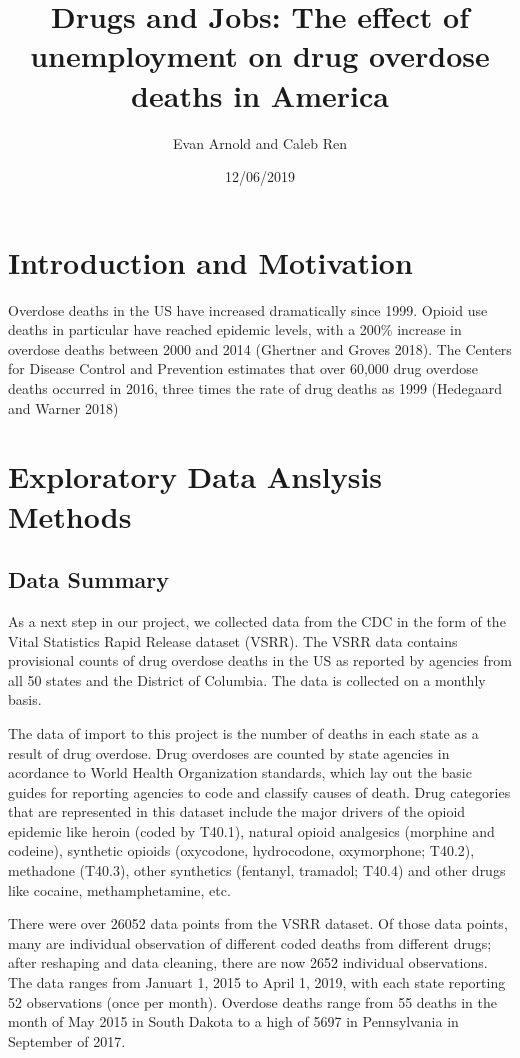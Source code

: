 \documentclass[]{article}
\title{Drugs and Jobs: The effect of unemployment on drug overdose deaths in
America}
\author{Evan Arnold and Caleb Ren}
\date{12/06/2019}
\begin{document}
\maketitle

\section{Introduction and Motivation}

Overdose deaths in the US have increased dramatically since 1999. Opioid
use deaths in particular have reached epidemic levels, with a 200\%
increase in overdose deaths between 2000 and 2014 (Ghertner and Groves
2018). The Centers for Disease Control and Prevention estimates that
over 60,000 drug overdose deaths occurred in 2016, three times the rate
of drug deaths as 1999 (Hedegaard and Warner 2018)

\section{Exploratory Data Anslysis Methods}

\subsection{Data Summary}

As a next step in our project, we collected data from the CDC in the
form of the Vital Statistics Rapid Release dataset (VSRR). The VSRR data
contains provisional counts of drug overdose deaths in the US as
reported by agencies from all 50 states and the District of Columbia.
The data is collected on a monthly basis.

The data of import to this project is the number of deaths in each state
as a result of drug overdose. Drug overdoses are counted by state
agencies in acordance to World Health Organization standards, which lay
out the basic guides for reporting agencies to code and classify causes
of death. Drug categories that are represented in this dataset include
the major drivers of the opioid epidemic like heroin (coded by T40.1),
natural opioid analgesics (morphine and codeine), synthetic opioids
(oxycodone, hydrocodone, oxymorphone; T40.2), methadone (T40.3), other
synthetics (fentanyl, tramadol; T40.4) and other drugs like cocaine,
methamphetamine, etc.

There were over 26052 data points from the VSRR dataset. Of those data
points, many are individual observation of different coded deaths from
different drugs; after reshaping and data cleaning, there are now 2652
individual observations. The data ranges from Januart 1, 2015 to April
1, 2019, with each state reporting 52 observations (once per month).
Overdose deaths range from 55 deaths in the month of May 2015 in South
Dakota to a high of 5697 in Pennsylvania in September of 2017.
\end{document}
